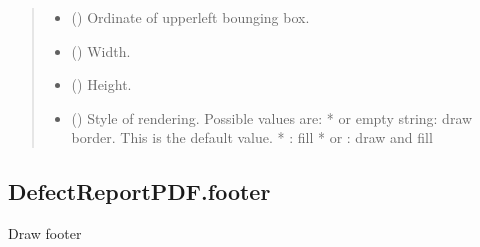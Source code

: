 \documentclass[letterpaper,10pt,english]{sphinxmanual}
\begin{document}
\begin{fulllineitems}
\begin{fulllineitems}
\begin{quote}
\begin{description}
\begin{itemize}
\item {} 
\sphinxAtStartPar
{} () \textendash{} Ordinate of upper\sphinxhyphen{}left bounging box.

\item {} 
\sphinxAtStartPar
{} () \textendash{} Width.

\item {} 
\sphinxAtStartPar
{} () \textendash{} Height.

\item {} 
\sphinxAtStartPar
{} () \textendash{} Style of rendering. Possible values are:
*  or empty string: draw border. This is the default value.
* : fill
*  or : draw and fill

\end{itemize}

\end{description}\end{quote}

\end{fulllineitems}



\subsection{DefectReportPDF.footer}
\label{\detokenize{generated/quality_assessment.quality_pdf_report.DefectReportPDF.footer:defectreportpdf-footer}}\label{\detokenize{generated/quality_assessment.quality_pdf_report.DefectReportPDF.footer::doc}}

\begin{fulllineitems}
\label{\detokenize{generated/quality_assessment.quality_pdf_report.DefectReportPDF.footer:quality_assessment.quality_pdf_report.DefectReportPDF.footer}}
\sphinxAtStartPar
Draw footer

\end{fulllineitems}




\end{fulllineitems}
\end{document}
